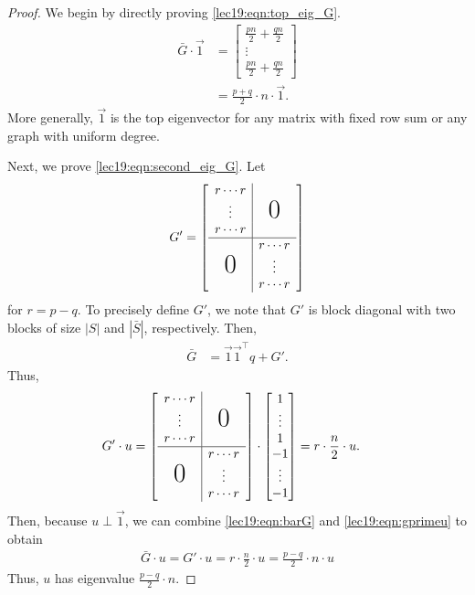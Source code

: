 \begin{proof}
We begin by directly proving \eqref{lec19:eqn:top_eig_G}.
\begin{align}	
	\bar{G} \cdot \vec{1}  &= \begin{bmatrix}
           \frac{pn}{2} + \frac{qn}{2} \\
           \vdots \\
           \frac{pn}{2} + \frac{qn}{2}
         \end{bmatrix} \\
         &= \frac{p+q}{2} \cdot n \cdot \vec{1}.
\end{align}
More generally, $\vec{1}$ is the top eigenvector for any matrix with fixed row sum or any graph with uniform degree. 

Next, we prove \eqref{lec19:eqn:second_eig_G}. Let 
\begin{align}
    G' = \left[
        \begin{array}{c|c}
        r \cdots r \\
        \vdots & \makebox{\text{\huge 0}} \\
        r \cdots r \\
        \hline
        & r \cdots r \\
        \makebox{\text{\huge 0}} & \vdots \\
        & r \cdots r
        \end{array}
        \right]
\end{align}
for $r = p - q$. To precisely define $G'$, we note that $G'$ is block diagonal with two blocks of size $|S|$ and $|\bar{S}|$, respectively. Then, 
\begin{align}	
	\bar{G} &= \vec{1} \vec{1}^\top q + G'. \label{lec19:eqn:barG}
\end{align}
Thus,
\begin{align}
 G' \cdot u &= \left[
    \begin{array}{c|c}
    r \cdots r \\
    \vdots & \makebox{\text{\huge 0}} \\
    r \cdots r \\
    \hline
    & r \cdots r \\
    \makebox{\text{\huge 0}} & \vdots \\
    & r \cdots r
    \end{array}
    \right] \cdot \begin{bmatrix}
           1 \\ \vdots \\ 1\\ -1 \\
           \vdots \\
           -1
         \end{bmatrix} = r \cdot \frac{n}{2} \cdot u. \label{lec19:eqn:gprimeu}
\end{align}
Then, because $u \perp \vec{1}$, we can combine \eqref{lec19:eqn:barG} and \eqref{lec19:eqn:gprimeu} to obtain
\begin{align}
\bar{G} \cdot u =  G' \cdot u =  r \cdot \frac{n}{2} \cdot u  = \frac{p-q}{2} \cdot n \cdot u
\end{align}
Thus, $u$ has eigenvalue $\frac{p-q}{2} \cdot n$. 
\end{proof}

